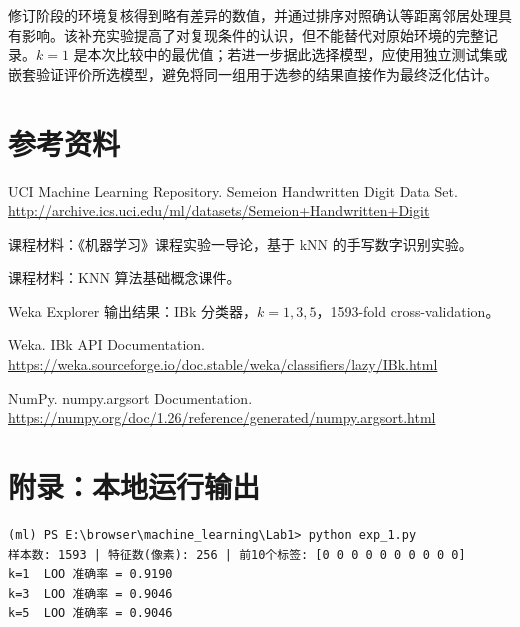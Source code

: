 \documentclass[UTF8,zihao=-4]{ctexart}
\begin{document}
修订阶段的环境复核得到略有差异的数值，并通过排序对照确认等距离邻居处理具有影响。该补充实验提高了对复现条件的认识，但不能替代对原始环境的完整记录。$k=1$ 是本次比较中的最优值；若进一步据此选择模型，应使用独立测试集或嵌套验证评价所选模型，避免将同一组用于选参的结果直接作为最终泛化估计。

\section*{参考资料}

\begin{enumerate}[label={[\arabic*]}]
  \item UCI Machine Learning Repository. Semeion Handwritten Digit Data Set. \url{http://archive.ics.uci.edu/ml/datasets/Semeion+Handwritten+Digit}
  \item 课程材料：《机器学习》课程实验一导论，基于 kNN 的手写数字识别实验。
  \item 课程材料：KNN 算法基础概念课件。
  \item Weka Explorer 输出结果：IBk 分类器，$k=1,3,5$，1593-fold cross-validation。
  \item Weka. IBk API Documentation. \url{https://weka.sourceforge.io/doc.stable/weka/classifiers/lazy/IBk.html}
  \item NumPy. numpy.argsort Documentation. \url{https://numpy.org/doc/1.26/reference/generated/numpy.argsort.html}
\end{enumerate}

\appendix
\section{附录：本地运行输出}

\begin{lstlisting}[basicstyle=\ttfamily\small,backgroundcolor=\color{codebg},frame=single,breaklines=true]
(ml) PS E:\browser\machine_learning\Lab1> python exp_1.py
样本数: 1593 | 特征数(像素): 256 | 前10个标签: [0 0 0 0 0 0 0 0 0 0]
k=1  LOO 准确率 = 0.9190
k=3  LOO 准确率 = 0.9046
k=5  LOO 准确率 = 0.9046
\end{lstlisting}
\end{document}
